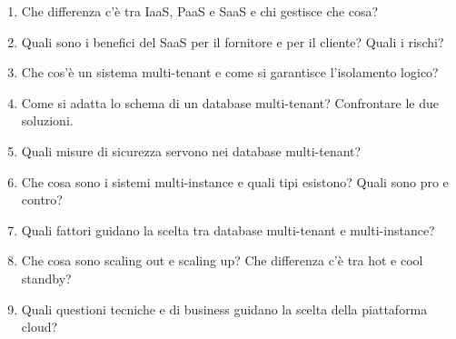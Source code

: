 \begin{domande}
\begin{enumerate}
  \item Che differenza c'è tra IaaS, PaaS e SaaS e chi gestisce che cosa?
  \item Quali sono i benefici del SaaS per il fornitore e per il cliente? Quali i rischi?
  \item Che cos'è un sistema multi-tenant e come si garantisce l'isolamento logico?
  \item Come si adatta lo schema di un database multi-tenant? Confrontare le due soluzioni.
  \item Quali misure di sicurezza servono nei database multi-tenant?
  \item Che cosa sono i sistemi multi-instance e quali tipi esistono? Quali sono pro e contro?
  \item Quali fattori guidano la scelta tra database multi-tenant e multi-instance?
  \item Che cosa sono scaling out e scaling up? Che differenza c'è tra hot e cool standby?
  \item Quali questioni tecniche e di business guidano la scelta della piattaforma cloud?
\end{enumerate}
\end{domande}
